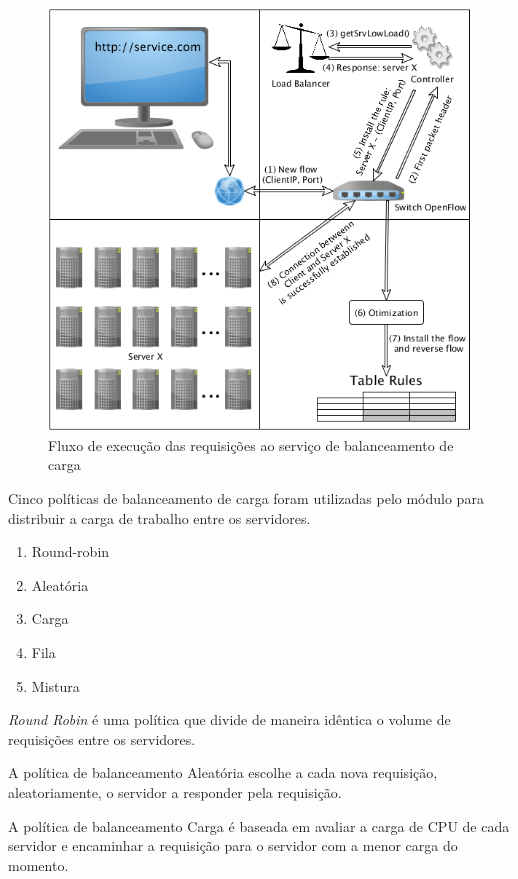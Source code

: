 \begin{figure}[htb!]
    \centering
    \includegraphics[width=\linewidth]{img/balancer-workflow}
    \caption{Fluxo de execução das requisições ao serviço de balanceamento 
    de carga}
    \label{fig:balancer-workflow}
\end{figure}


Cinco políticas de balanceamento de carga foram utilizadas pelo módulo para 
distribuir a carga de trabalho entre os servidores.

\begin{enumerate}
    \item Round-robin
    \item Aleatória
    \item Carga
    \item Fila 
    \item Mistura
\end{enumerate}

\emph{Round Robin} é uma política que divide de maneira idêntica o volume de
requisições entre os servidores.

A política de balanceamento Aleatória escolhe a cada nova requisição, 
aleatoriamente, o servidor a responder pela requisição.

A política de balanceamento Carga é baseada em avaliar a carga de CPU 
de cada servidor e encaminhar a requisição para o servidor com a menor 
carga do momento.
    
